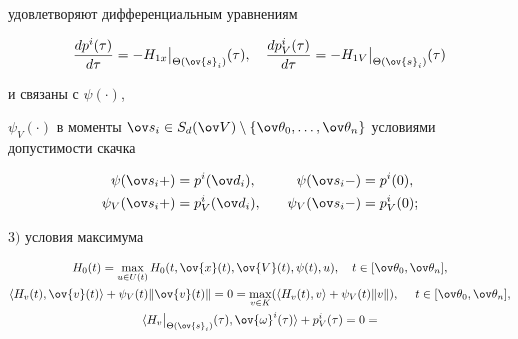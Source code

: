 \begin{thm}
удовлетворяют дифференциальным уравнениям


\begin{equation}


\frac{dp^i(\tau)}{d\tau}= -


{H}_{1x} \big|_{\Theta(\ov{s}_i)}(\tau), \quad


\frac{dp_V^i(\tau)}{d\tau}= -


{H}_{1V} \big|_{\Theta(\ov{s}_i)}(\tau) \label{eq:(5.46)}


\end{equation}


и связаны с $\psi(\cdot)$,


$\psi_V(\cdot)$ в моменты $\ov s_i\in S_d(\ov V)\setminus


\{\ov\theta_0,\dotsc,\ov\theta_n\}$ условиями допустимости скачка


\begin{alignat*}{2}


\psi(\ov s_i+)&=p^i(\ov d_i),&\quad


\psi(\ov s_i-)&=p^i(0),\\


\psi_V(\ov s_i+)&=p_V^i(\ov d_i),&\quad \psi_V(\ov s_i-)&=


p_V^i(0);


\end{alignat*}





$3)$ условия максимума


\begin{gather}


{H}_0(t)= \max_{u \in U(t)}


H_0(t,\ov{x}(t),\ov{V}(t),\psi(t), u), \quad t


\in [\ov \theta_0,\ov \theta_n],\notag\\ 


%


\langle {H}_v(t),\ov{v}(t)\rangle


+\psi_V(t)\|\ov{v}(t)\|= 0=


\max_{v \in K}(\langle {H}_v(t),v\rangle


+\psi_V(t)\|v\|), \quad \ t \in [\ov


\theta_0,\ov \theta_n], \label{eq:(5.9)} \\


\langle {H}_{v} \big|_{


\Theta(\ov{s}_i)}(\tau),\ov{\omega}^i(\tau)\rangle


+p_V^i(\tau)= 0= 



\end{gather}
\end{thm}
